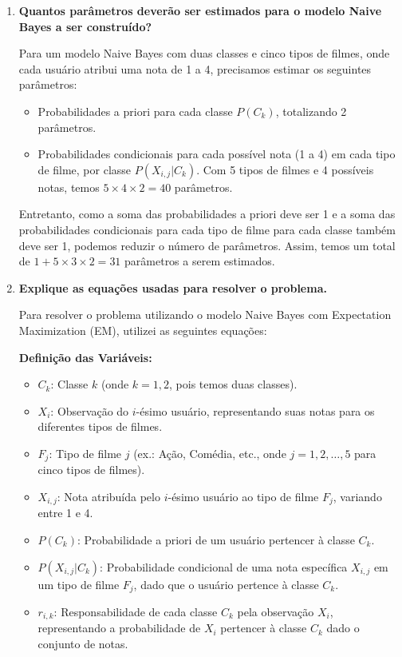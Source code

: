 \begin{enumerate}[label=(\alph*)]

    \item \textbf{Quantos parâmetros deverão ser estimados para o modelo Naive Bayes a ser construído?}

        Para um modelo Naive Bayes com duas classes e cinco tipos de filmes, onde cada usuário atribui uma nota de 1 a 4, precisamos estimar os seguintes parâmetros:
        
        \begin{itemize}
            \item Probabilidades a priori para cada classe \( P(C_k) \), totalizando 2 parâmetros.
            \item Probabilidades condicionais para cada possível nota (1 a 4) em cada tipo de filme, por classe \( P(X_{i,j} | C_k) \). Com 5 tipos de filmes e 4 possíveis notas, temos \(5 \times 4 \times 2 = 40\) parâmetros.
        \end{itemize}

        Entretanto, como a soma das probabilidades a priori deve ser 1 e a soma das probabilidades condicionais para cada tipo de filme para cada classe também deve ser 1, podemos reduzir o número de parâmetros. Assim, temos um total de \(1 + 5 \times 3 \times 2 = 31\) parâmetros a serem estimados.
        
    \item \textbf{Explique as equações usadas para resolver o problema.}

        Para resolver o problema utilizando o modelo Naive Bayes com Expectation Maximization (EM), utilizei as seguintes equações:
        
        \textbf{Definição das Variáveis:}
        \begin{itemize}
            \item \( C_k \): Classe \( k \) (onde \( k = 1, 2 \), pois temos duas classes).
            \item \( X_i \): Observação do \( i \)-ésimo usuário, representando suas notas para os diferentes tipos de filmes.
            \item \( F_j \): Tipo de filme \( j \) (ex.: Ação, Comédia, etc., onde \( j = 1, 2, \ldots, 5 \) para cinco tipos de filmes).
            \item \( X_{i,j} \): Nota atribuída pelo \( i \)-ésimo usuário ao tipo de filme \( F_j \), variando entre 1 e 4.
            \item \( P(C_k) \): Probabilidade a priori de um usuário pertencer à classe \( C_k \).
            \item \( P(X_{i,j} | C_k) \): Probabilidade condicional de uma nota específica \( X_{i,j} \) em um tipo de filme \( F_j \), dado que o usuário pertence à classe \( C_k \).
            \item \( r_{i,k} \): Responsabilidade de cada classe \( C_k \) pela observação \( X_i \), representando a probabilidade de \( X_i \) pertencer à classe \( C_k \) dado o conjunto de notas.
        \end{itemize}
        

\end{enumerate}
